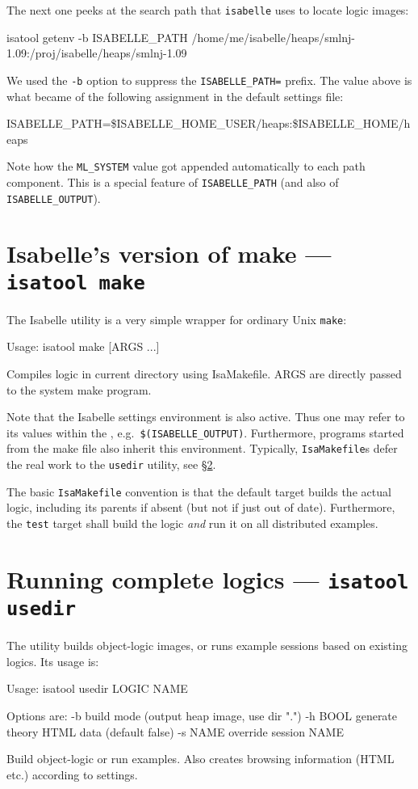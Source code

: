 The next one peeks at the search path that \texttt{isabelle} uses to
locate logic images:
\begin{ttbox}
isatool getenv -b ISABELLE_PATH
{\out /home/me/isabelle/heaps/smlnj-1.09:/proj/isabelle/heaps/smlnj-1.09}
\end{ttbox}
We used the \texttt{-b} option to suppress the \texttt{ISABELLE_PATH=}
prefix.  The value above is what became of the following assignment in
the default settings file:
\begin{ttbox}
ISABELLE_PATH=\$ISABELLE_HOME_USER/heaps:\$ISABELLE_HOME/heaps
\end{ttbox}
Note how the \texttt{ML_SYSTEM} value got appended automatically to
each path component. This is a special feature of
\texttt{ISABELLE_PATH} (and also of \texttt{ISABELLE_OUTPUT}).


\section{Isabelle's version of make --- \texttt{isatool make}}

The Isabelle  utility is a very simple wrapper for
ordinary Unix \texttt{make}:
\begin{ttbox}
Usage: isatool make [ARGS ...]

  Compiles logic in current directory using IsaMakefile.
  ARGS are directly passed to the system make program.
\end{ttbox}
Note that the Isabelle settings environment is also active. Thus one
may refer to its values within the , e.g.\ 
\texttt{\$(ISABELLE_OUTPUT)}. Furthermore, programs started from the
make file also inherit this environment.  Typically,
\texttt{IsaMakefile}s defer the real work to the \texttt{usedir}
utility, see \S\ref{sec:tool-usedir}.

\medskip The basic \texttt{IsaMakefile} convention is that the default
target builds the actual logic, including its parents if absent (but
not if just out of date). Furthermore, the \texttt{test} target shall
build the logic \emph{and} run it on all distributed examples.


\section{Running complete logics --- \texttt{isatool usedir}} \label{sec:tool-usedir}

The  utility builds object-logic images, or runs
example sessions based on existing logics. Its usage is:
\begin{ttbox}
Usage: isatool usedir LOGIC NAME

  Options are:
    -b           build mode (output heap image, use dir ".")
    -h BOOL      generate theory HTML data (default false)
    -s NAME      override session NAME

  Build object-logic or run examples. Also creates browsing
  information (HTML etc.) according to settings.
\end{ttbox}

